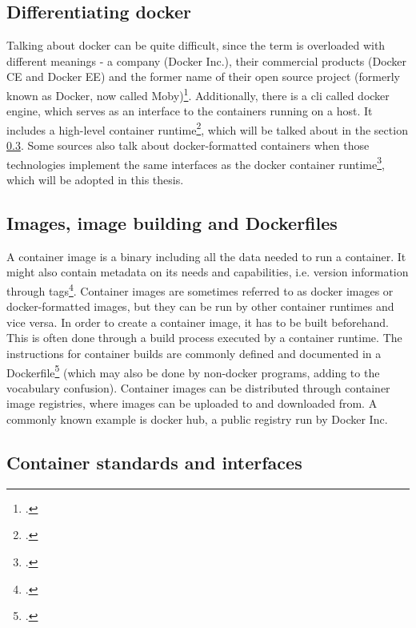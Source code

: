 \subsection{Differentiating docker}
Talking about docker can be quite difficult, since the term is overloaded with different meanings - a company (Docker Inc.), their commercial products (Docker CE and Docker EE) and the former name of their open source project (formerly known as Docker, now called Moby)\footcite[][, section 'What is Moby?']{dockerMoby}.
Additionally, there is a \gls{cli} called docker engine, which serves as an interface to the containers running on a host. It includes a high-level container runtime\footcite[][, section 'Develop, Ship and Run Any Application, Anywhere']{dockerEngine}, which will be talked about in the section \ref{runtimes}.
Some sources also talk about docker-formatted containers when those technologies implement the same interfaces as the docker container runtime\footcite[][, section '1.11. Working with Docker formatted containers']{dockerFormatted}, which will be adopted in this thesis.

\subsection{Images, image building and Dockerfiles}
A container image is a binary including all the data needed to run a container. It might also contain metadata on its needs and capabilities, i.e. version information through tags\footcite[][, section 'Docker Images']{redhatImages}.
Container images are sometimes referred to as docker images or docker-formatted images, but they can be run by other container runtimes and vice versa.
In order to create a container image, it has to be built beforehand. This is often done through a build process executed by a container runtime. The instructions for container builds are commonly defined and documented in a Dockerfile\footcite[][, section 'Dockerfile reference']{dockerfileDocs} (which may also be done by non-docker programs, adding to the vocabulary confusion).
Container images can be distributed through container image registries, where images can be uploaded to and downloaded from. A commonly known example is docker hub, a public registry run by Docker Inc.

\subsection{Container standards and interfaces} \label{runtimes}

